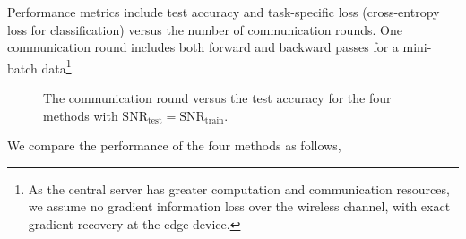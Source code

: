 Performance metrics include test accuracy and task-specific loss (cross-entropy loss for classification) versus the number of communication rounds. One communication round includes both forward and backward passes for a mini-batch data\footnote{As the central server has greater computation and communication resources, we assume no gradient information loss over the wireless channel, with exact gradient recovery at the edge device.}.
\begin{figure*}[t]
    \centering
    \captionsetup[subfigure]{labelformat=empty}


    \caption{The communication round versus the test accuracy for the four methods with $\text{SNR}_{\text{test}}=\text{SNR}_{\text{train}}$.}
    \label{fig:results1}
\end{figure*}
We compare the performance of the four methods as follows,
